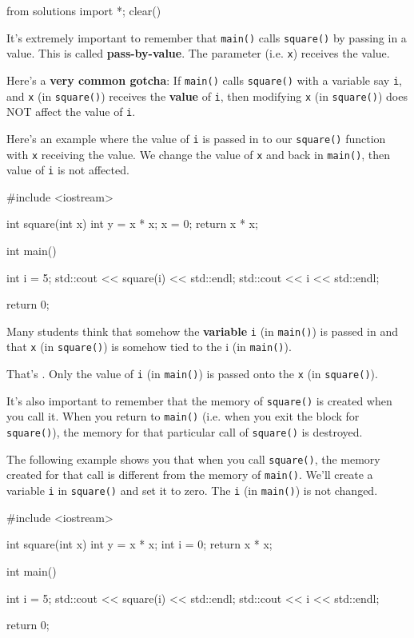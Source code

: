 \begin{python0}
from solutions import *; clear()
\end{python0}

It's extremely important to remember that \texttt{main()} calls \texttt{square()} by passing in a value. This is called \textbf{pass-by-value}. The parameter (i.e. \texttt{x}) receives the value.

Here's a \textbf{very common gotcha}: If \texttt{main()} calls \texttt{square()} with a variable say \texttt{i}, and \texttt{x} (in \texttt{square()}) receives the \textbf{value} of \texttt{i}, then modifying \texttt{x} (in \texttt{square()}) does NOT affect the value of \texttt{i}.

Here's an example where the value of \texttt{i} is passed in to our \texttt{square()} function with \texttt{x} receiving the value. We change the value of \texttt{x} and back in \texttt{main()}, then value of \texttt{i} is not affected.

\begin{consolethree}[escapeinside=||]
#include <iostream>

int square(int x)
{
    int y = x * x;
    x = 0;
    return x * x;
}

int main()
{
    int i = 5;
    std::cout << square(i) << std::endl;
    std::cout << i << std::endl;

    return 0;
}
\end{consolethree}

Many students think that somehow the \textbf{variable} \texttt{i} (in \texttt{main()}) is passed in and that \texttt{x} (in \texttt{square()}) is somehow tied to the i (in \texttt{main()}).

That's . Only the value of \texttt{i} (in \texttt{main()}) is passed onto the \texttt{x} (in \texttt{square()}). 

It's also important to remember that the memory of \texttt{square()} is created when you call it. When you return to \texttt{main()} (i.e. when you exit the block for \texttt{square()}), the memory for that particular call of \texttt{square()} is destroyed.

The following example shows you that when you call \texttt{square()}, the memory created for that call is different from the memory of \texttt{main()}. We'll create a variable \texttt{i} in \texttt{square()} and set it to zero. The \texttt{i} (in \texttt{main()}) is not changed.

\begin{consolethree}[escapeinside=||]
#include <iostream>

int square(int x)
{
    int y = x * x;
    int i = 0;
    return x * x;
}

int main()
{
    int i = 5;
    std::cout << square(i) << std::endl;
    std::cout << i << std::endl;

    return 0;
}
\end{consolethree}


